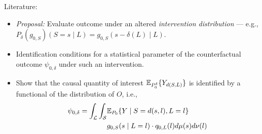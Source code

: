 \documentclass{beamer}
\begin{document}

\begin{frame}[c]{Literature: \cite{diaz2012population, diaz2018stochastic}}

\begin{center}
\begin{itemize}
  \itemsep8pt
  \item \textit{Proposal:} Evaluate outcome under an altered
    \textit{intervention distribution} --- e.g.,
    $P_{\delta}(g_{0,S})(S = s \mid L) = g_{0,S}(s - \delta(L) \mid L)$.
  \item Identification conditions for a statistical parameter of the
    counterfactual outcome $\psi_{0,\delta}$ under such an intervention.
  \item Show that the causal quantity of interest $\mathbb{E}_{P_0^{\delta}}
    \{Y_{d(S, L)}\}$ is identified by a functional of the distribution of $O$,
    i.e.,
    \begin{align*}\label{eqn:identification2012}
      \psi_{0,\delta} = \int_{\mathcal{L}} \int_{\mathcal{S}} &\mathbb{E}_{P_0}
        \{Y \mid S = d(s, l), L = l\} \\ &g_{0, S}(s \mid L = l) \cdot
        q_{0, L}(l) d\mu(s)d\nu(l)
    \end{align*}
\end{itemize}
\end{center}


\end{frame}

\end{document}
